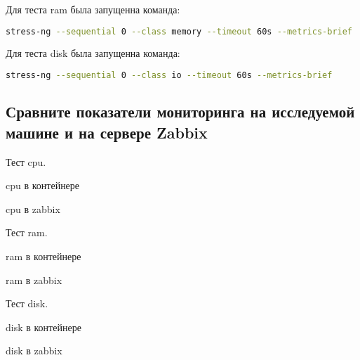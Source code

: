 Для теста ram была запущенна команда:

\begin{lstlisting}[language=bash]
stress-ng --sequential 0 --class memory --timeout 60s --metrics-brief
\end{lstlisting}


Для теста disk была запущенна команда:

\begin{lstlisting}[language=bash]
stress-ng --sequential 0 --class io --timeout 60s --metrics-brief
\end{lstlisting}

\subsection{Сравните показатели мониторинга на исследуемой машине  и на сервере Zabbix}

Тест cpu.

\begin{image}
    \caption{cpu в контейнере}
    \label{fig:stress_cpu}
\end{image}

\begin{image}
    \caption{cpu в zabbix}
    \label{fig:stress_cpu_zab}
\end{image}

\clearpage


Тест ram.

\begin{image}
    \caption{ram в контейнере}
    \label{fig:stress_ram}
\end{image}

\begin{image}
    \caption{ram в zabbix}
    \label{fig:stress_ram_zab}
\end{image}

\clearpage

Тест disk.

\begin{image}
    \caption{disk в контейнере}
    \label{fig:stress_disk}
\end{image}

\begin{image}
    \caption{disk в zabbix}
    \label{fig:stress_zabbix_disk}
\end{image}




